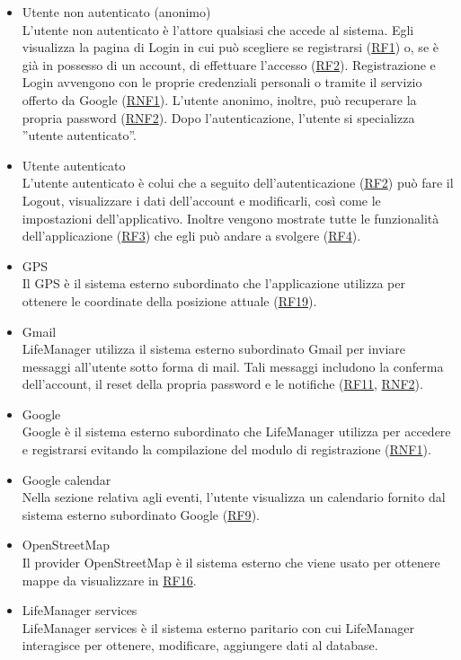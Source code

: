 \documentclass[a4paper,12pt]{article}
\begin{document}
\begin{itemize} \setlength\itemsep{0.01em}
  \item{\sffamily  Utente non autenticato (anonimo)}
    \\L'utente non autenticato è l'attore qualsiasi che accede al sistema. Egli visualizza la pagina di Login in cui può scegliere se registrarsi (\hyperlink{RF1}{RF1}) o, se è già in possesso di un account, di effettuare l'accesso (\hyperlink{RF2}{RF2}). Registrazione e Login avvengono con le proprie credenziali personali o tramite il servizio offerto da Google (\hyperlink{RNF1}{RNF1}). L'utente anonimo, inoltre, può recuperare la propria password (\hyperlink{RNF2}{RNF2}).
    Dopo l'autenticazione, l'utente si specializza ''utente autenticato''.
    
    
 \item{\sffamily Utente autenticato}\\
    L'utente autenticato è colui che a seguito dell'autenticazione (\hyperlink{RF2}{RF2}) può fare il Logout, visualizzare i dati dell'account e modificarli, così come le impostazioni dell'applicativo. Inoltre vengono mostrate tutte le funzionalità dell'applicazione (\hyperlink{RF3}{RF3}) che egli può andare a svolgere (\hyperlink{RF4}{RF4}). 
   
   
  \item{\sffamily GPS}\\
    Il GPS è il sistema esterno subordinato che l'applicazione utilizza per ottenere le coordinate della posizione attuale (\hyperlink{RF19}{RF19}).
    
    
  \item{\sffamily Gmail}\\
    LifeManager utilizza il sistema esterno subordinato Gmail per inviare messaggi all'utente sotto forma di mail. Tali messaggi includono la conferma dell'account, il reset della propria password e le notifiche (\hyperlink{RF11}{RF11}, \hyperlink{RNF2}{RNF2}).
  
  
 \item {\sffamily Google}\\
    Google è il sistema esterno subordinato che LifeManager utilizza per accedere e registrarsi evitando la compilazione del modulo di registrazione (\hyperlink{RNF1}{RNF1}).  
 
 \item {\sffamily Google calendar}\\
    Nella sezione relativa agli eventi, l'utente visualizza un calendario fornito dal sistema esterno subordinato Google (\hyperlink{RF9}{RF9}). 
 
 \item {\sffamily OpenStreetMap}\\
    Il provider OpenStreetMap è il sistema esterno che viene usato per ottenere mappe da visualizzare in \hyperlink{RF16}{RF16}.

\item {\sffamily LifeManager services}\\
    LifeManager services è il sistema esterno paritario con cui LifeManager interagisce per ottenere, modificare, aggiungere dati al database. 

\end{itemize}
\end{document}
